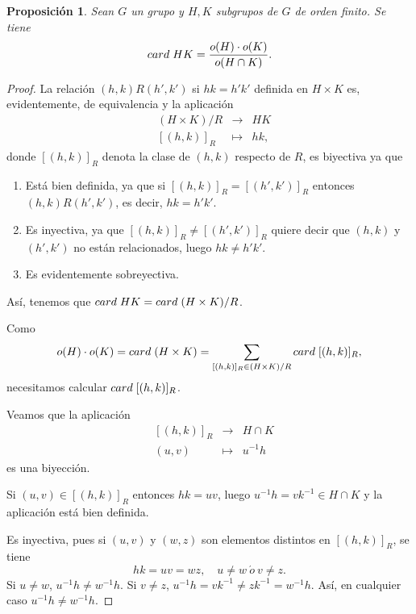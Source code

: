 \documentclass[12pt]{article}
\newtheorem{proposition}[theorem]{Proposición}
\begin{document}
\begin{proposition}\label{prop:cardGrups} Sean $G$ un grupo y $H,K$ subgrupos de $G$ de orden finito. Se tiene $$card \hspace{0.1cm} HK = \dfrac{o(H)\cdot o(K)}{o(H \cap K)}.$$
\end{proposition}
\begin{proof}
La relación $(h,k) R (h',k')$ si $hk = h'k'$ definida en $H \times K$ es, evidentemente, de equivalencia y la aplicación $$
\begin{array}{rccl}
&(H\times K)/R& \longrightarrow &HK\\
&[(h,k)]_R & \longmapsto &hk,
\end{array}
$$ donde $[(h,k)]_R$ denota la clase de $(h,k)$ respecto de $R$, es biyectiva ya que
\begin{enumerate}
\item Está bien definida, ya que si $[(h,k)]_R = [(h',k')]_R$ entonces $(h,k) R(h',k')$, es decir, $hk = h'k'$.
\item Es inyectiva, ya que $[(h,k)]_R \neq [(h',k')]_R$ quiere decir que $(h,k)$ y $(h',k')$ no están relacionados, luego $hk \neq h'k'$.
\item Es evidentemente sobreyectiva.
\end{enumerate}

Así, tenemos que $card \hspace{0.1cm} HK = card \hspace{0.1cm} (H \times K)/R$.

Como $$o(H) \cdot o(K) = card \hspace{0.1cm} (H \times K) = \sum_{[(h,k)]_R \in (H\times K)/R}card\hspace{0.1cm}[(h,k)]_R,$$ necesitamos calcular $card \hspace{0.1cm}[(h,k)]_R$.

Veamos que la aplicación $$
\begin{array}{rccl}
&[(h,k)]_R& \longrightarrow &H\cap K\\
&(u,v)& \longmapsto &u^{-1}h
\end{array}
$$
es una biyección.

Si $(u,v) \in [(h,k)]_R$ entonces $hk = uv$, luego $u^{-1}h = vk^{-1} \in H \cap K$ y la aplicación está bien definida. 

Es inyectiva, pues si $(u,v)$ y $(w,z)$ son elementos distintos en $[(h,k)]_R$, se tiene $$hk = uv = wz, \quad u \neq w~\acute{o}~ v \neq z.$$ 
Si $u \neq w$, $u^{-1}h \neq w^{-1}h$. Si $v \neq z$, $u^{-1}h = vk^{-1} \neq zk^{-1} = w^{-1}h$. Así, en cualquier caso $u^{-1}h \neq w^{-1}h$.


\end{proof}
\end{document}
